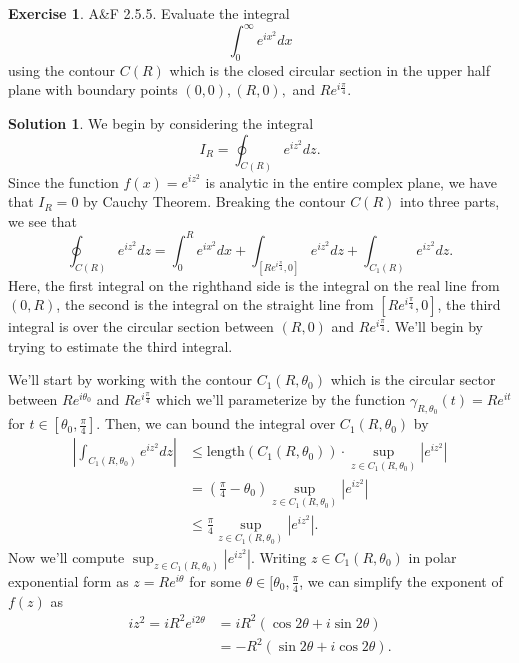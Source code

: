 \documentclass[12pt]{article}
\newcommand{\abs}[1]{ \left| #1 \right| }
\theoremstyle{definition}
\newtheorem{exer}{Exercise}
\newtheorem{sol}{Solution}
\theoremstyle{remark}
\begin{document}
\newpage

\begin{exer}
    A\&F 2.5.5. Evaluate the integral
    \begin{equation}
        \int_0^\infty e^{ix^2}dx
    \end{equation}
    using the contour $C(R)$ which is the closed circular section in the upper half plane with boundary points $(0,0), (R,0),$ and $Re^{i\frac{\pi}{4}}$.
\end{exer}
\begin{sol}
We begin by considering the integral
\begin{equation}
    I_R = \oint_{C(R)} e^{iz^2}dz.
\end{equation}
Since the function $f(x)=e^{iz^2}$ is analytic in the entire complex plane, we have that $I_R = 0$ by Cauchy Theorem.  Breaking the contour $C(R)$ into three parts, we see that 
\begin{equation}
    \label{eq:3_parts}
    \oint_{C(R)} e^{iz^2}dz = \int_{0}^{R} e^{ix^2}dx + \int_{[Re^{i\frac{\pi}{4}},0]} e^{iz^2}dz + \int_{C_1(R)} e^{iz^2}dz. 
\end{equation}
Here, the first integral on the righthand side is the integral on the real line from $(0,R)$, the second is the integral on the straight line from $[Re^{i\frac{\pi}{4}},0]$, the third integral is over the circular section between $(R,0)$ and $Re^{i\frac{\pi}{4}}$. We'll begin by trying to estimate the third integral.

We'll start by working with the contour $C_1(R,\theta_0)$ which is the circular sector between $Re^{i\theta_0}$ and $Re^{i\frac{\pi}{4}}$ which we'll parameterize by the function $\gamma_{R,\theta_0}(t) = Re^{it}$ for $t\in [\theta_0, \frac{\pi}{4}]$. Then, we can bound the integral over $C_1(R,\theta_0)$ by
\begin{align}
\abs{\int_{C_1(R,\theta_0)} e^{iz^2}dz} &\leq \text{length}(C_1(R,\theta_0)) \cdot \sup_{z\in C_1(R,\theta_0)} \abs{e^{iz^2}}\\
                                           &= \left(\frac{\pi}{4}-\theta_0 \right)\sup_{z\in C_1(R,\theta_0)} \abs{e^{iz^2}} \\
                                           &\leq \frac{\pi}{4}\sup_{z\in C_1(R,\theta_0)} \abs{e^{iz^2}}.
\end{align}
Now we'll compute $\sup_{z\in C_1(R,\theta_0)} \abs{e^{iz^2}}$. Writing $z\in C_1(R,\theta_0)$ in polar exponential form as $z=Re^{i\theta}$ for some $\theta \in [\theta_0, \frac{\pi}{4}$, we can simplify the exponent of $f(z)$ as
\begin{align}
    iz^2 = iR^2 e^{i 2\theta} &= iR^2(\cos2\theta + i\sin2\theta)\\
                              &= -R^2(\sin2\theta + i\cos2\theta).
\end{align}


\end{sol}
\end{document}
